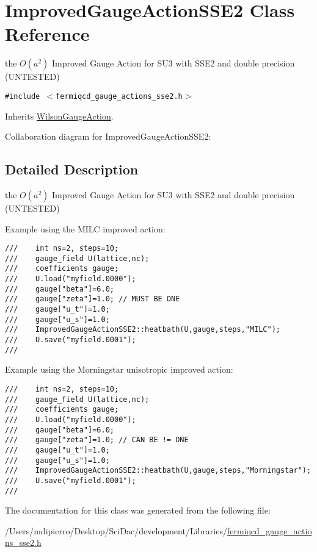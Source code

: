 \hypertarget{class_improved_gauge_action_s_s_e2}{
\section{ImprovedGaugeActionSSE2 Class Reference}
\label{class_improved_gauge_action_s_s_e2}
}
the $ O(a^2)$ Improved Gauge Action for SU3 with SSE2 and double precision (UNTESTED)  


{\tt \#include $<$fermiqcd\_\-gauge\_\-actions\_\-sse2.h$>$}

Inherits \hyperlink{class_wilson_gauge_action}{WilsonGaugeAction}.

Collaboration diagram for ImprovedGaugeActionSSE2:

\subsection{Detailed Description}
the $ O(a^2)$ Improved Gauge Action for SU3 with SSE2 and double precision (UNTESTED) 

Example using the MILC improved action: 

\footnotesize\begin{verbatim}
///    int ns=2, steps=10;
///    gauge_field U(lattice,nc);
///    coefficients gauge;
///    U.load("myfield.0000");
///    gauge["beta"]=6.0;
///    gauge["zeta"]=1.0; // MUST BE ONE
///    gauge["u_t"]=1.0;
///    gauge["u_s"]=1.0;
///    ImprovedGaugeActionSSE2::heatbath(U,gauge,steps,"MILC");
///    U.save("myfield.0001");
/// \end{verbatim}
\normalsize
 Example using the Morningstar unisotropic improved action: 

\footnotesize\begin{verbatim}
///    int ns=2, steps=10;
///    gauge_field U(lattice,nc);
///    coefficients gauge;
///    U.load("myfield.0000");
///    gauge["beta"]=6.0;
///    gauge["zeta"]=1.0; // CAN BE != ONE
///    gauge["u_t"]=1.0;
///    gauge["u_s"]=1.0;
///    ImprovedGaugeActionSSE2::heatbath(U,gauge,steps,"Morningstar");
///    U.save("myfield.0001");
/// \end{verbatim}
\normalsize
 

The documentation for this class was generated from the following file:\begin{CompactItemize}
\item 
/Users/mdipierro/Desktop/SciDac/development/Libraries/\hyperlink{fermiqcd__gauge__actions__sse2_8h}{fermiqcd\_\-gauge\_\-actions\_\-sse2.h}\end{CompactItemize}
